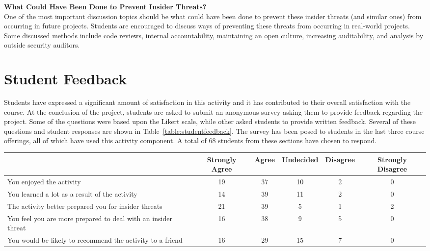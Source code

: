 \documentclass[conference]{IEEEtran}
\begin{document}
\textbf{What Could Have Been Done to Prevent Insider Threats?}\\
One of the most important discussion topics should be what could have been done to prevent these insider threats (and similar ones) from occurring in future projects. Students are encouraged to discuss ways of preventing these threats from occurring in real-world projects. Some discussed methods include code reviews, internal accountability, maintaining an open culture, increasing auditability, and analysis by outside security auditors. \\


\section{Student Feedback}
\label{sec: studentfeedback}


Students have expressed a significant amount of satisfaction in this activity and it has contributed to their overall satisfaction with the course. At the conclusion of the project, students are asked to submit an anonymous survey asking them to provide feedback regarding the project. Some of the questions were based upon the Likert scale, while other asked students to provide written feedback. Several of these questions and student responses are shown in Table~\ref{table:studentfeedback}. The survey has been posed to students in the last three course offerings, all of which have used this activity component. A total of 68 students from these sections have chosen to respond.

\begin{table*}[t]
\caption{Student Responses}
\centering
    \begin{tabular}{ l | c | c | c | c | c     }

	\bfseries  & \bfseries Strongly Agree & \bfseries Agree & \bfseries Undecided & \bfseries Disagree  & \bfseries Strongly Disagree \\ \hline \hline

	 You enjoyed the activity & 19 & 37 & 10 & 2  & 0 \\ \hline
	 You learned a lot as a result of the activity & 14 & 39 & 11 & 2  & 0 \\ \hline
	 The activity better prepared you for insider threats  & 21 & 39 & 5 & 1 & 2 \\ \hline
	 You feel you are more prepared to deal with an insider threat & 16 & 38 & 9 & 5  & 0 \\ \hline
	 You would be likely to recommend the activity to a friend & 16 & 29 & 15 & 7 & 0 \\

    \end{tabular}

\label{table:studentfeedback}
\end{table*}
\end{document}
